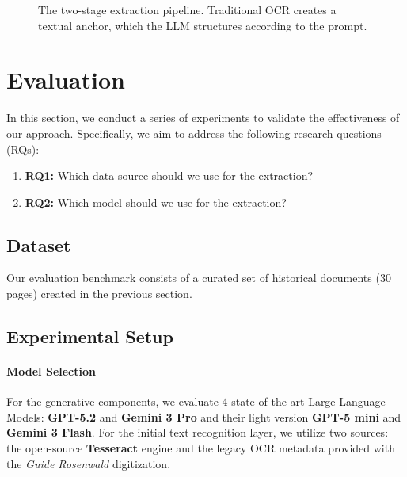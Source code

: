 \begin{figure}[htbp]
{
    } %
    
    \caption{The two-stage extraction pipeline. Traditional OCR creates a textual anchor, which the LLM structures according to the prompt.}
    \label{fig:extraction_pipeline}
\end{figure}

\section{Evaluation}
\label{sec:evaluation}

In this section, we conduct a series of experiments to validate the effectiveness of our approach. Specifically, we aim to address the following research questions (RQs):


\begin{enumerate}
    \item \textbf{RQ1:} Which data source should we use for the extraction?
    \item \textbf{RQ2:} Which model should we use for the extraction?
\end{enumerate}


\subsection{Dataset}
Our evaluation benchmark consists of a curated set of historical documents (30 pages) created in the previous section. 



\subsection{Experimental Setup}

\paragraph{Model Selection}
For the generative components, we evaluate 4 state-of-the-art Large Language Models: \textbf{GPT-5.2} and \textbf{Gemini 3 Pro} and their light version \textbf{GPT-5 mini} and \textbf{Gemini 3 Flash}. For the initial text recognition layer, we utilize two sources: the open-source \textbf{Tesseract} engine and the legacy OCR metadata provided with the \textit{Guide Rosenwald} digitization.

